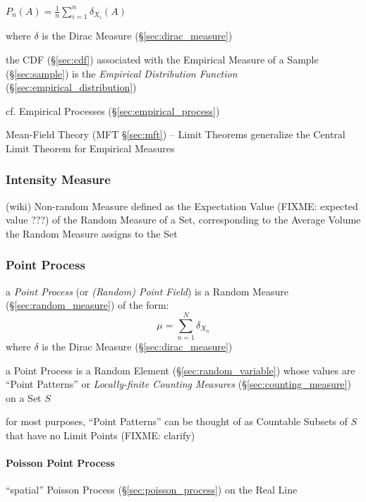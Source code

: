 $P_n(A) = \frac{1}{n}\sum_{i=1}^n \delta_{X_i}(A)$

where $\delta$ is the Dirac Measure (\S\ref{sec:dirac_measure})

the CDF (\S\ref{sec:cdf}) associated with the Empirical Measure of a Sample
(\S\ref{sec:sample}) is the \emph{Empirical Distribution Function}
(\S\ref{sec:empirical_distribution})

cf. Empirical Processes (\S\ref{sec:empirical_process})

\fist Mean-Field Theory (MFT \S\ref{sec:mft}) -- Limit Theorems generalize the
Central Limit Theorem for Empirical Measures



\subsubsection{Intensity Measure}\label{sec:intensity_measure}

(wiki) Non-random Measure defined as the Expectation Value (FIXME: expected
value ???) of the Random Measure of a Set, corresponding to the Average Volume
the Random Measure assigns to the Set



\subsubsection{Point Process}\label{sec:point_process}

a \emph{Point Process} (or \emph{(Random) Point Field}) is a Random Measure
(\S\ref{sec:random_measure}) of the form:
\[
  \mu = \sum_{n=1}^N \delta_{X_n}
\]
where $\delta$ is the Dirac Measure (\S\ref{sec:dirac_measure})

a Point Process is a Random Element (\S\ref{sec:random_variable}) whose values
are ``Point Patterns'' or \emph{Locally-finite Counting Measures}
(\S\ref{sec:counting_measure}) on a Set $S$

for most purposes, ``Point Patterns'' can be thought of as Countable Subsets of
$S$ that have no Limit Points (FIXME: clarify)



\paragraph{Poisson Point Process}\label{sec:point_poisson}\hfill

``spatial'' Poisson Process (\S\ref{sec:poisson_process}) on the Real Line

